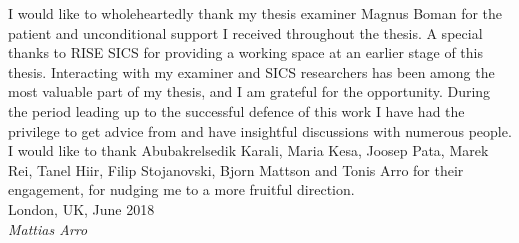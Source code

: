 I would like to wholeheartedly thank my thesis examiner Magnus Boman for the patient and unconditional support I received throughout the thesis.
A special thanks to RISE SICS for providing a working space at an earlier stage of this thesis.
Interacting with my examiner and SICS researchers has been among the most valuable part of my thesis, and I am grateful for the opportunity.
During the period leading up to the successful defence of this work I have had the privilege to get advice from and have insightful discussions with numerous people.
I would like to thank Abubakrelsedik Karali, Maria Kesa, Joosep Pata, Marek Rei, Tanel Hiir, Filip Stojanovski, Bjorn Mattson and Tonis Arro for their engagement, for nudging me to a more fruitful direction.\\

\noindent
London, UK, June 2018 \\
\textit{Mattias Arro}
\newpage
